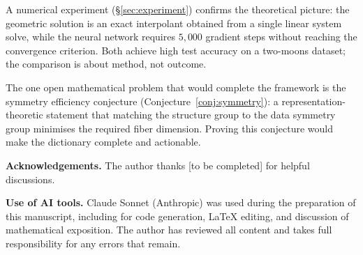 \documentclass[11pt, a4paper]{article}
\theoremstyle{plain}
\theoremstyle{definition}
\begin{document}
A numerical experiment (\S\ref{sec:experiment}) confirms the theoretical picture:
the geometric solution is an exact interpolant obtained from a single linear
system solve, while the neural network requires $5{,}000$ gradient steps without
reaching the convergence criterion. Both achieve high test accuracy on a
two-moons dataset; the comparison is about method, not outcome.

The one open mathematical problem that would complete the framework is the symmetry
efficiency conjecture (Conjecture~\ref{conj:symmetry}): a representation-theoretic
statement that matching the structure group to the data symmetry group minimises
the required fiber dimension. Proving this conjecture would make the dictionary
complete and actionable.

\bigskip\bigskip

\noindent\textbf{Acknowledgements.}
The author thanks [to be completed] for helpful discussions.

\noindent\textbf{Use of AI tools.}
Claude Sonnet (Anthropic) was used during the preparation of this manuscript,
including for code generation, LaTeX editing, and discussion of mathematical
exposition. The author has reviewed all content and takes full responsibility
for any errors that remain.
\end{document}

